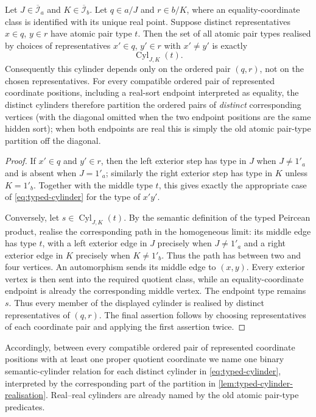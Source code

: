 \begin{lemma}
\label{lem:typed-cylinder-realisation}
Let \(J\in\overline{\mathcal I}_a\) and
\(K\in\overline{\mathcal I}_b\).  Let \(q\in a/J\) and \(r\in b/K\),
where an equality-coordinate class is identified with its unique real point.
Suppose distinct representatives \(x\in q\), \(y\in r\) have atomic pair type \(t\).
Then the set of all atomic pair types realised by choices of representatives
\(x'\in q\), \(y'\in r\) with \(x'\neq y'\) is exactly
\[
 \operatorname{Cyl}_{J,K}(t).
\]
Consequently this cylinder depends only on the ordered pair \((q,r)\), not
on the chosen representatives.  For every compatible ordered pair of
represented coordinate positions, including a real-sort endpoint interpreted
as equality, the distinct cylinders therefore partition the ordered pairs of
\emph{distinct} corresponding vertices (with the diagonal omitted when the
two endpoint positions are the same hidden sort); when both endpoints are real
this is simply the old atomic pair-type partition off the diagonal.
\end{lemma}

\begin{proof}
If \(x'\in q\) and \(y'\in r\), then the left exterior step has type in
\(J\) when \(J\neq1'_a\) and is absent when \(J=1'_a\); similarly the
right exterior step has type in \(K\) unless \(K=1'_b\).  Together with the
middle type \(t\), this gives exactly the appropriate case of
\eqref{eq:typed-cylinder} for the type of \(x'y'\).

Conversely, let \(s\in\operatorname{Cyl}_{J,K}(t)\).  By the semantic
definition of the typed Peircean product, realise the corresponding path in
the homogeneous limit: its middle edge has type \(t\), with a left exterior
edge in \(J\) precisely when \(J\neq1'_a\) and a right exterior edge in
\(K\) precisely when \(K\neq1'_b\).  Thus the path has between two and four
vertices.  An automorphism sends its middle edge to \((x,y)\).  Every exterior
vertex is then sent into the required quotient class, while an
equality-coordinate endpoint is already the corresponding middle vertex.
The endpoint type remains \(s\).  Thus every member of the displayed cylinder
is realised by distinct representatives of \((q,r)\).  The final assertion follows by
choosing representatives of each coordinate pair and applying the first
assertion twice.
\end{proof}

Accordingly, between every compatible ordered pair of represented coordinate
positions with at least one proper quotient coordinate we name one binary
semantic-cylinder relation for each distinct cylinder in
\eqref{eq:typed-cylinder}, interpreted by the corresponding part of the
partition in \cref{lem:typed-cylinder-realisation}.  Real--real cylinders are
already named by the old atomic pair-type predicates.

